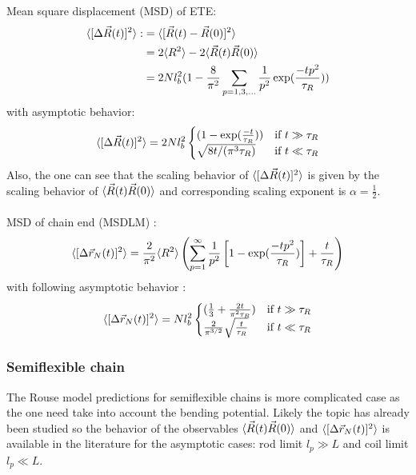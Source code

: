 \documentclass[
    paper=A4,pagesize=automedia,fontsize=12pt,
    BCOR=15mm,DIV=22,
    twoside,headinclude,footinclude=false,
    fleqn,             %
    bibliography=totocnumbered,          %
    listof=totoc,                %
    listof=flat,                 %
    cleardoublepage=empty      %
    numbers=endperiod
]{scrartcl}
\begin{document}
\\
\\
Mean square displacement (MSD) of ETE:
\begin{equation} \label{eq:rouse_msd_ete}
    \begin{aligned}
        \langle[\Delta \vec{R}(t)]^2\rangle :&= \langle[\vec{R}(t)-\vec{R}(0)]^2\rangle \\
        & = 2\langle R^2\rangle - 2 \langle\vec{R}(t)\vec{R}(0)\rangle \\
        & = 2 N l_b^2 (1 - \frac{8}{\pi^2}\sum_{p=1,3,\ldots}\frac{1}{p^2} \exp(\frac{-tp^2}{\tau_R}))
    \end{aligned}
\end{equation}
with asymptotic behavior:
\begin{equation}
    \langle[\Delta \vec{R}(t)]^2\rangle = 2Nl_b^2 \begin{cases}
        (1-\exp(\frac{-t}{\tau_R})) & \text{if } t \gg \tau_R \\
        \sqrt{8t/(\pi^3\tau_R)} & \text{if } t \ll \tau_R
    \end{cases}
\end{equation}
Also, the one can see that the scaling behavior of $\langle[\Delta \vec{R}(t)]^2\rangle$ is given
by the scaling behavior of $\langle\vec{R}(t)\vec{R}(0)\rangle$ and corresponding
scaling exponent is $\alpha = \frac{1}{2}$.
\\
\\
MSD of chain end (MSDLM) \cite{svaneborg_2020}:
\begin{equation}
    \langle[\Delta \vec{r}_N(t)]^2\rangle = \frac{2}{\pi^2} \langle R^2\rangle \left( \sum_{p=1}^{\infty} \frac{1}{p^2} \left[ 1-\exp(\frac{-t p^2}{\tau_R}) \right] + \frac{t}{\tau_R} \right)
\end{equation}
with following asymptotic behavior \cite{svaneborg_2020}:
\begin{equation}
    \langle[\Delta \vec{r}_N(t)]^2\rangle = N l_b^2 \begin{cases}
        (\frac{1}{3} + \frac{2t}{\pi^2 \tau_R}) & \text{if } t \gg \tau_R \\
        \frac{2}{\pi^{3/2}} \sqrt{\frac{t}{\tau_R}} & \text{if } t \ll \tau_R
    \end{cases}
\end{equation}

\subsubsection{Semiflexible chain}
\label{sec:rouse_semiflex_chain}
The Rouse model predictions for semiflexible chains is more complicated
case as the one need take into account the bending potential. 
Likely the topic has already been studied so the behavior of the
observables $\langle\vec{R}(t)\vec{R}(0)\rangle$ and $\langle[\Delta \vec{r}_N(t)]^2\rangle$ 
is available in the literature \cite{Nikoubashman2016} for the asymptotic
cases: rod limit $l_p \gg L$ and coil limit $l_p \ll L$.
\end{document}
